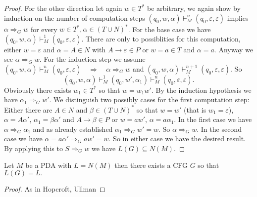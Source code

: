 \begin{proof}
  For the other direction let again $w\in T^*$ be arbitrary, we again show by induction
  on the number of computation steps $(q_0,w,\alpha)\vdash_M^n(q_0,\varepsilon,\varepsilon)$
  implies $\alpha \Rightarrow_G w$ for every $w\in T^*, \alpha \in (T\cup N)^*$.
  For the base case we have $(q_0,w,\alpha)\vdash_M^1(q_0,\varepsilon,\varepsilon)$. There
  are only to possiblities for this computation,
  either $w=\varepsilon$ and $\alpha = A\in N$ with $A\to\varepsilon\in P$ or $w=a\in T$
  and $\alpha=a$. Anyway we see $\alpha \Rightarrow_G w$. For the induction step
  we assume $(q_0,w,\alpha)\vdash_M^n(q_0,\varepsilon,\varepsilon)\quad\Longrightarrow \quad
  \alpha \Rightarrow_G w$ and $(q_0,w,\alpha)\vdash_M^{n+1}(q_0,\varepsilon,\varepsilon)$.
  So
  \[
    (q_0,w,\alpha)\vdash_M^1(q_0,w',\alpha_1)\vdash_M^n(q_0,\varepsilon,\varepsilon).
  \]
  Obviously there exists $w_1\in T^*$ so that $w=w_1w'$. By the induction hypothesis
  we have $\alpha_1 \Rightarrow_G w'$. We distinguish  two possibly cases for the first
  computation step: Either there are $A\in N$ and $\beta \in (T\cup N)^*$ so that
  $w=w'$ (that is $w_1=\varepsilon$), $\alpha=A\alpha'$,
  $\alpha_1=\beta\alpha'$ and $A\to\beta\in P$ or $w=aw'$, $\alpha=a\alpha_1$. In the first
  case we have $\alpha \Rightarrow_G \alpha_1$ and as already established
  $\alpha_1 \Rightarrow_G w'=w$. So $\alpha \Rightarrow_G w$. In the second case
  we have $\alpha = a \alpha' \Rightarrow_G a w' = w.$ So in either case we have the desired result.
  By applying this to $S\Rightarrow_G w$ we have $L(G)\subseteq N(M)$.


\end{proof}
\begin{theorem}\label{thm:CFG_of_PDA}
  Let $M$ be a PDA with $L=N(M)$ then there exists a CFG $G$ so that $L(G)=L.$
\end{theorem}
\begin{proof}
  As in Hopcroft, Ullman
\end{proof}
